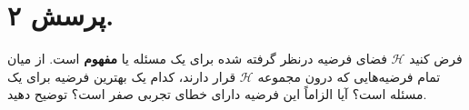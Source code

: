 \section{پرسش ۲.}
فرض کنید $\mathcal{H}$ فضای فرضیه درنظر گرفته شده برای یک مسئله یا \textbf{مفهوم} است. از میان تمام فرضیه‌هایی که درون مجموعه $\mathcal{H}$ قرار دارند، کدام یک بهترین فرضیه برای یک مسئله است؟ آیا الزاماً این فرضیه دارای خطای تجربی صفر است؟ توضیح دهید.